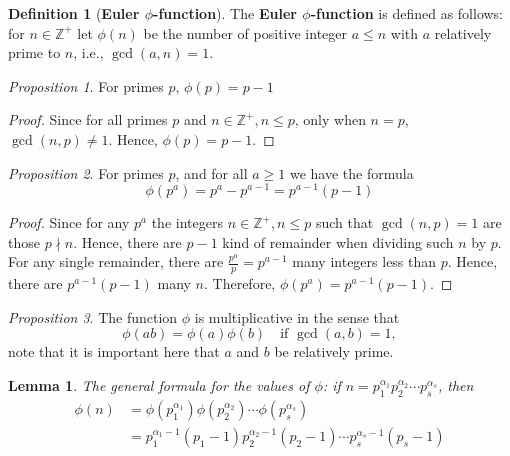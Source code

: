 \documentclass[paper=a4, fontsize=11pt]{scrartcl}
\newtheorem{lemma}[theorem]{Lemma}
\numberwithin{equation}{section}		%
\numberwithin{figure}{section}			%
\numberwithin{table}{section}				%
\theoremstyle{definition}
\newtheorem{definition}{Definition}[section]
\theoremstyle{remark}
\theoremstyle{example}
\newtheorem{prop}{Proposition}[section]
\begin{document}
\begin{definition}[\textbf{Euler $\phi$-function}]
    The \textbf{Euler $\phi$-function} is defined as follows: for $n \in \mathbb{Z}^{+}$ let $\phi(n)$ be the number of positive integer $a \leq n$ with $a$ relatively prime to $n$, i.e., $\gcd(a,n) = 1$.
\end{definition}

\begin{prop}
    For primes $p$, $\phi(p) = p - 1$
\end{prop}

\begin{proof}
    Since for all primes $p$ and $n \in \mathbb{Z}^{+}, n \leq p$, only when $n = p$, $\gcd(n,p) \neq 1$. Hence, $\phi(p) = p-1$.
\end{proof}

\begin{prop}
    For primes $p$, and for all $a \geq 1$ we have the formula
    \begin{equation}
        \phi(p^a) = p^a - p^{a-1} = p^{a-1}(p-1)
    \end{equation}
\end{prop}

\begin{proof}
    Since for any $p^a$ the integers $n \in \mathbb{Z}^{+}, n \leq p$ such that $\gcd(n,p) = 1$ are those $p \nmid n$. Hence, there are $p-1$ kind of remainder when dividing such $n$ by $p$. For any single remainder, there are $\tfrac{p^a}{p} = p^{a-1}$ many integers less than $p$. Hence, there are $p^{a-1}(p-1)$ many $n$. Therefore, $\phi(p^a) = p^{a-1}(p-1)$.
\end{proof}

\begin{prop}
    The function $\phi$ is multiplicative in the sense that
    \begin{equation}
        \phi(ab) = \phi(a)\phi(b) \quad \text{if } \gcd(a,b) = 1,
    \end{equation}
    note that it is important here that $a$ and $b$ be relatively prime.
\end{prop}

\begin{lemma}
    The general formula for the values of $\phi$: if $n = p_1^{\alpha_1}p_2^{\alpha_2}\cdots p_s^{\alpha_s}$, then 
    \begin{equation}
        \begin{aligned}
            \phi(n) &= \phi(p_1^{\alpha_1})\phi(p_2^{\alpha_2})\cdots \phi(p_s^{\alpha_s})\\
            &= p_1^{\alpha_1-1}(p_1-1)p_2^{\alpha_2-1}(p_2-1)\cdots p_s^{\alpha_s-1}(p_s-1)
        \end{aligned}
    \end{equation}
\end{lemma}
\end{document}
